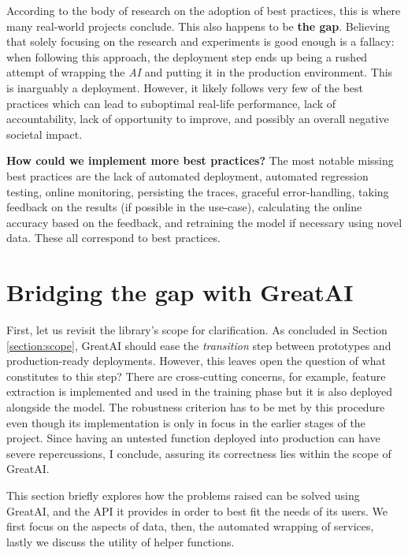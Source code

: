 According to the body of research on the adoption of best practices, this is where many real-world projects conclude. This also happens to be \textbf{the gap}. Believing that solely focusing on the research and experiments is good enough is a fallacy: when following this approach, the deployment step ends up being a rushed attempt of wrapping the \textit{AI} and putting it in the production environment. This is inarguably a deployment. However, it likely follows very few of the best practices which can lead to suboptimal real-life performance, lack of accountability, lack of opportunity to improve, and possibly an overall negative societal impact.

\begin{displayquote}
\textbf{How could we implement more best practices?} The most notable missing best practices are the lack of automated deployment, automated regression testing, online monitoring, persisting the traces, graceful error-handling, taking feedback on the results (if possible in the use-case), calculating the online accuracy based on the feedback, and retraining the model if necessary using novel data. These all correspond to best practices.
\end{displayquote}

\section{Bridging \textbf{the gap} with GreatAI}

First, let us revisit the library's scope for clarification. As concluded in Section \ref{section:scope}, GreatAI should ease the \textit{transition} step between prototypes and production-ready deployments. However, this leaves open the question of what constitutes to this step? There are cross-cutting concerns, for example, feature extraction is implemented and used in the training phase but it is also deployed alongside the model. The robustness criterion has to be met by this procedure even though its implementation is only in focus in the earlier stages of the project. Since having an untested function deployed into production can have severe repercussions, I conclude, assuring its correctness lies within the scope of GreatAI.

This section briefly explores how the problems raised can be solved using GreatAI, and the API it provides in order to best fit the needs of its users. We first focus on the aspects of data, then, the automated wrapping of services, lastly we discuss the utility of helper functions.

